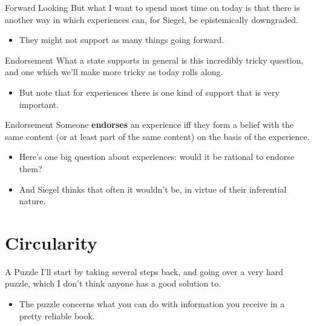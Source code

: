 \documentclass[
  17pt,
  letterpaper,
  ignorenonframetext,
  aspectratio=169,
  xcolor={dvipsnames}]{beamer}
\providecommand{\tightlist}{%
  \setlength{\itemsep}{0pt}\setlength{\parskip}{0pt}}\usepackage{longtable,booktabs,array}
\begin{document}
\begin{frame}{Forward Looking}
\protect\hypertarget{forward-looking}{}
But what I want to spend most time on today is that there is another way
in which experiences can, for Siegel, be epistemically downgraded.

\begin{itemize}[<+->]
\tightlist
\item
  They might not support as many things going forward.
\end{itemize}
\end{frame}

\begin{frame}{Endorsement}
\protect\hypertarget{endorsement}{}
What a state supports in general is this incredibly tricky question, and
one which we'll make more tricky as today rolls along.

\begin{itemize}[<+->]
\tightlist
\item
  But note that for experiences there is one kind of support that is
  very important.
\end{itemize}
\end{frame}

\begin{frame}{Endorsement}
\protect\hypertarget{endorsement-1}{}
Someone \textbf{endorses} an experience iff they form a belief with the
same content (or at least part of the same content) on the basis of the
experience.

\begin{itemize}[<+->]
\tightlist
\item
  Here's one big question about experiences: would it be rational to
  endorse them?
\item
  And Siegel thinks that often it wouldn't be, in virtue of their
  inferential nature.
\end{itemize}
\end{frame}

\hypertarget{circularity}{%
\section{Circularity}\label{circularity}}

\begin{frame}{A Puzzle}
\protect\hypertarget{a-puzzle}{}
I'll start by taking several steps back, and going over a very hard
puzzle, which I don't think anyone has a good solution to.

\begin{itemize}[<+->]
\tightlist
\item
  The puzzle concerns what you can do with information you receive in a
  pretty reliable book.
\end{itemize}
\end{frame}
\end{document}
